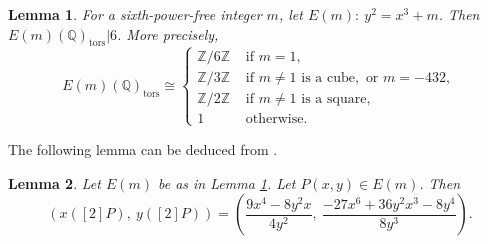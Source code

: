 \documentclass[12pt, 14paper,reqno]{amsart}
\theoremstyle{plain}
\newtheorem{lem}{Lemma}[section]
\theoremstyle{proof}
\numberwithin{equation}{section}
\begin{document}
\begin{lem}\label{lsi1} 
For a sixth-power-free integer $m$, let $E(m):~ y^{2}=x^{3}+m$. Then
$E(m)(\mathbb{Q})_{\text{tors}}|6$. More precisely, 
$$
E(m)(\mathbb{Q})_{\text{tors}}\cong \begin{cases}  
\mathbb{Z}/6\mathbb{Z} & \text{ if } m=1,
\\ 
\mathbb{Z}/ 3\mathbb{Z} & \text{ if } m\neq 1 \text{ is a cube}, \text{ or } m=-432,
\\
\mathbb{Z}/ 2\mathbb{Z} & \text{ if } m\neq 1 \text{ is a square},
\\
1& \text{ otherwise}.
\end{cases}
$$ 
\end{lem}
The  following lemma can be deduced from \cite[p. 203]{SI}.
\begin{lem}\label{lsi2} Let $E(m)$ be as in Lemma \ref{lsi1}. Let $P(x,y) \in  E(m)$. Then
$$
\left(x([2]P),~ y([2]P)\right)=\left( \frac{9x^{4}-8y^{2}x}{4y^{2}},~ \frac{-27x^{6}+36y^{2}x^{3}-8y^{4}}{8y^{3}}\right).
$$
\end{lem}
\end{document}
